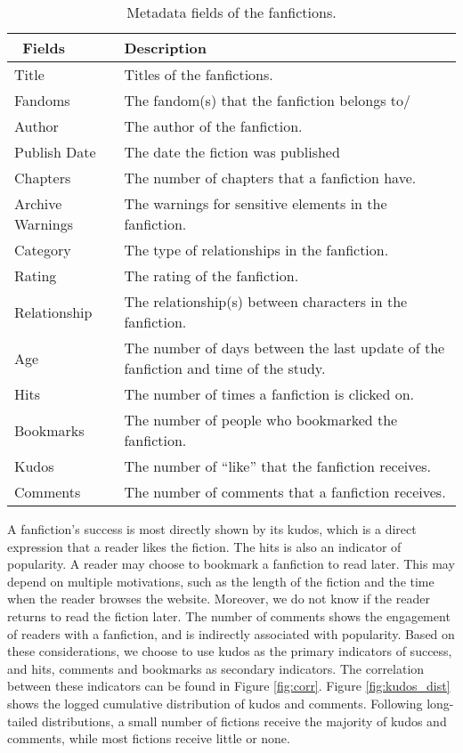 \documentclass[a4paper]{article}
\begin{document}
\begin{table}
\centering
\begin{tabular}[width=0.8\textwidth]{p{3cm}p{10cm}}
\toprule
\ Fields & Description \\ 
   \hline			
Title & Titles of the fanfictions.  \\
Fandoms & The fandom(s) that the fanfiction belongs to/ \\
Author & The author of the fanfiction.  \\
Publish Date & The date the fiction was published \\
Chapters & The number of chapters that a fanfiction have. \\
Archive Warnings & The warnings for sensitive elements in the fanfiction. \\
Category & The type of relationships in the fanfiction. \\
Rating & The rating of the fanfiction. \\
Relationship & The relationship(s) between characters in the fanfiction. \\
Age & The number of days between the last update of the fanfiction and time of the study. \\
\hline
Hits & The number of times a fanfiction is clicked on. \\
Bookmarks & The number of people who bookmarked the fanfiction.\\
Kudos & The number of ``like'' that the fanfiction receives. \\
Comments & The number of comments that a fanfiction receives.\\
\bottomrule
\end{tabular}
\caption{Metadata fields of the fanfictions.}
\label{tab:metadata}
\end{table}%

A fanfiction's success is most directly shown by its kudos, which is a direct expression that a reader likes the fiction. The hits is also an indicator of popularity. A reader may choose to bookmark a fanfiction to read later. This may depend on multiple motivations, such as the length of the fiction and the time when the reader browses the website. Moreover, we do not know if the reader returns to read the fiction later. The number of comments shows the engagement of readers with a fanfiction, and is  indirectly associated with popularity. Based on these considerations, we choose to use kudos as the primary indicators of success, and hits, comments and bookmarks as secondary indicators. The correlation between these indicators can be found in Figure \ref{fig:corr}. Figure \ref{fig:kudos_dist} shows the logged cumulative distribution of kudos and comments. Following long-tailed distributions, a small number of fictions receive the majority of kudos and comments, while most fictions receive little or none. 
\end{document}
